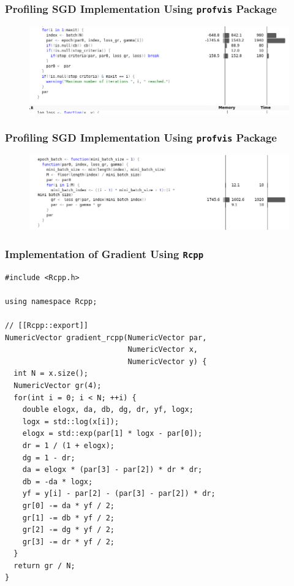 \documentclass[aspectratio=169]{beamer}
\begin{document}
\begin{frame}
    \frametitle{Profiling SGD Implementation Using \texttt{profvis} Package}
    \begin{figure}
        \centering
        \includegraphics[scale = 0.4]{figure/SGDProf.png}
    \end{figure}
\end{frame}
\begin{frame}
    \frametitle{Profiling SGD Implementation Using \texttt{profvis} Package}
    \begin{figure}
        \centering
        \includegraphics[scale = 0.4]{figure/EpochProf.png}
    \end{figure}
\end{frame}
\begin{frame}[fragile]
    \frametitle{Implementation of Gradient Using \texttt{Rcpp}}
\begin{verbatim}
#include <Rcpp.h>

using namespace Rcpp;

// [[Rcpp::export]]
NumericVector gradient_rcpp(NumericVector par,
                            NumericVector x,
                            NumericVector y) {
  int N = x.size();
  NumericVector gr(4);
  for(int i = 0; i < N; ++i) {
    double elogx, da, db, dg, dr, yf, logx;
    logx = std::log(x[i]);
    elogx = std::exp(par[1] * logx - par[0]);
    dr = 1 / (1 + elogx);
    dg = 1 - dr;
    da = elogx * (par[3] - par[2]) * dr * dr;
    db = -da * logx;
    yf = y[i] - par[2] - (par[3] - par[2]) * dr;
    gr[0] -= da * yf / 2;
    gr[1] -= db * yf / 2;
    gr[2] -= dg * yf / 2;
    gr[3] -= dr * yf / 2;
  }
  return gr / N;
}   
\end{verbatim}
\end{frame}
\end{document}
